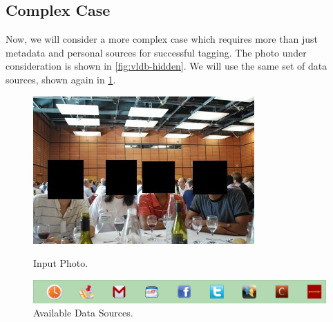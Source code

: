 
\subsection{Complex Case}
Now, we will consider a more complex case which requires more than just metadata and personal sources for successful tagging. The photo under consideration is shown in \ref{fig:vldb-hidden}. We will use the same set of data sources, shown again in \ref{fig:vldb-sources}.

\begin{figure}[ht]
\begin{minipage}[b]{0.45\linewidth}
\centering
\includegraphics[width=\textwidth]{media/chapter4/stacktrace/vldb-hide-all.jpg}
\caption{Input Photo.}
\label{fig:vldb-hidden}
\end{minipage}
\hspace{0.5cm}
\begin{minipage}[b]{0.45\linewidth}
\centering
\includegraphics[width=\textwidth]{media/chapter4/stacktrace/sources.png}
\caption{Available Data Sources.}
\label{fig:vldb-sources}
\end{minipage}
\end{figure}

